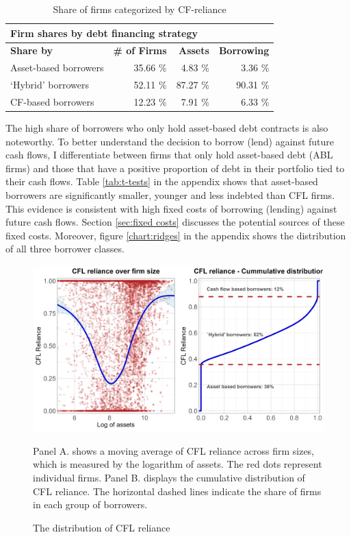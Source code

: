 \documentclass[12pt]{article}
\begin{document}
\begin{table}[h!]
\centering
\begin{tabular}{l|rrr}
\multicolumn{4}{l}{\textbf{Firm shares by debt financing strategy}} \\
\hline
\hspace{2.2cm} \textbf{Share by} & \textbf{\# of Firms} & \textbf{Assets}  & \textbf{Borrowing} \\  
Asset-based borrowers & 35.66 \% & 4.83 \% & 3.36 \% \\ 
`Hybrid' borrowers & 52.11 \% & 87.27 \% & 90.31  \% \\ 
CF-based borrowers & 12.23 \% & 7.91 \% & 6.33  \% \\ 
   \bottomrule
\end{tabular}
\caption{\small Share of firms categorized by CF-reliance} 
\label{tab:shares}
\end{table}

\noindent The high share of borrowers who only hold asset-based debt contracts is also noteworthy. To better understand the decision to borrow (lend) against future cash flows, I differentiate between firms that only hold asset-based debt (ABL firms) and those that have a positive proportion of debt in their portfolio tied to their cash flows. Table \ref{tab:t-tests} in the appendix shows that asset-based borrowers are significantly smaller, younger and less indebted than CFL firms. This evidence is consistent with high fixed costs of borrowing (lending) against future cash flows. Section \ref{sec:fixed costs} discusses the potential sources of these fixed costs.  Moreover, figure \ref{chart:ridges} in the appendix shows the distribution of all three borrower classes. \\

\begin{figure}[H]  %
    \centering
    \caption{The distribution of CFL reliance} \label{chart:CFLcdf}
    \includegraphics[width=1\textwidth]{smoothcfd.png}
     \begin{justify}
     \small Panel A. shows a moving average of CFL reliance across firm sizes, which is measured by the logarithm of assets. The red dots represent individual firms. Panel B. displays the cumulative distribution of CFL reliance. The horizontal dashed lines indicate the share of firms in each group of borrowers. 
    \end{justify}
\end{figure}
\end{document}
